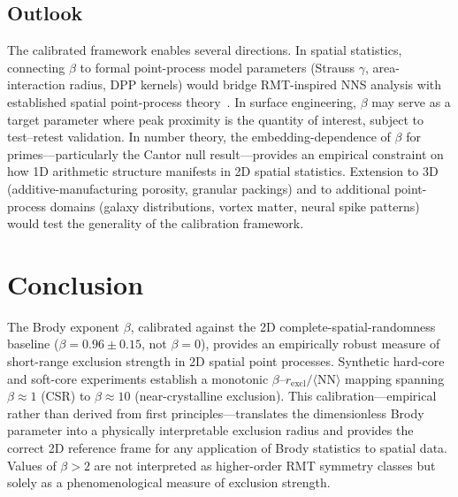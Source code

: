 \documentclass[final,1p,times]{elsarticle}
\theoremstyle{definition}
\begin{document}
\subsection{Outlook}

The calibrated framework enables several directions. In spatial
statistics, connecting $\beta$ to formal point-process model parameters
(Strauss $\gamma$, area-interaction radius, DPP kernels) would bridge
RMT-inspired NNS analysis with established spatial point-process
theory~\cite{FORRESTER-2010}. In surface engineering, $\beta$ may serve
as a target parameter where peak proximity is the quantity of interest,
subject to test--retest validation. In number theory, the
embedding-dependence of $\beta$ for primes---particularly the Cantor
null result---provides an empirical constraint on how 1D arithmetic
structure manifests in 2D spatial statistics. Extension to 3D
(additive-manufacturing porosity, granular packings) and to additional
point-process domains (galaxy distributions, vortex matter, neural
spike patterns) would test the generality of the calibration
framework.

\section{Conclusion}

The Brody exponent $\beta$, calibrated against the 2D complete-spatial-randomness
baseline ($\beta = 0.96 \pm 0.15$, not $\beta = 0$), provides an empirically
robust measure of short-range exclusion strength in 2D spatial
point processes. Synthetic hard-core and soft-core experiments establish a
monotonic $\beta$--$r_{\text{excl}}/\langle\text{NN}\rangle$ mapping spanning
$\beta \approx 1$ (CSR) to $\beta \approx 10$ (near-crystalline exclusion).
This calibration---empirical rather than derived from first principles---translates
the dimensionless Brody parameter into a physically interpretable exclusion
radius and provides the correct 2D reference frame for any application of
Brody statistics to spatial data. Values of $\beta>2$ are not interpreted
as higher-order RMT symmetry classes but solely as a phenomenological
measure of exclusion strength.
\end{document}
